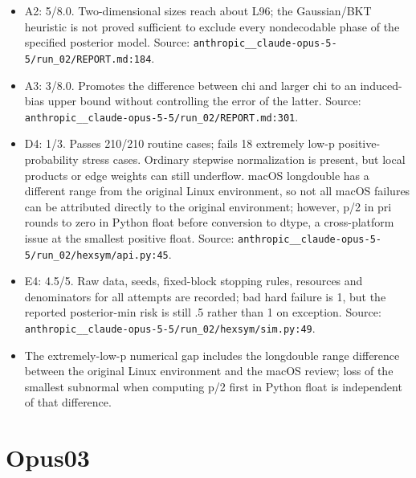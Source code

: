 \documentclass[11pt,a4paper]{article}
\begin{document}
\begin{itemize}
\item A2: 5/\allowbreak{}8.0. Two-dimensional sizes reach about L96; the Gaussian/\allowbreak{}BKT heuristic is not proved sufficient to exclude every nondecodable phase of the specified posterior model. Source: \nolinkurl{anthropic__claude-opus-5-5/run_02/REPORT.md:184}.
\item A3: 3/\allowbreak{}8.0. Promotes the difference between chi and larger chi to an induced-bias upper bound without controlling the error of the latter. Source: \nolinkurl{anthropic__claude-opus-5-5/run_02/REPORT.md:301}.
\item D4: 1/\allowbreak{}3. Passes 210/\allowbreak{}210 routine cases; fails 18 extremely low-p positive-probability stress cases. Ordinary stepwise normalization is present, but local products or edge weights can still underflow. macOS longdouble has a different range from the original Linux environment, so not all macOS failures can be attributed directly to the original environment; however, p/\allowbreak{}2 in pri rounds to zero in Python float before conversion to dtype, a cross-platform issue at the smallest positive float. Source: \nolinkurl{anthropic__claude-opus-5-5/run_02/hexsym/api.py:45}.
\item E4: 4.5/\allowbreak{}5. Raw data, seeds, fixed-block stopping rules, resources and denominators for all attempts are recorded; bad hard failure is 1, but the reported posterior-min risk is still .5 rather than 1 on exception. Source: \nolinkurl{anthropic__claude-opus-5-5/run_02/hexsym/sim.py:49}.
\item The extremely-low-p numerical gap includes the longdouble range difference between the original Linux environment and the macOS review; loss of the smallest subnormal when computing p/\allowbreak{}2 first in Python float is independent of that difference.
\end{itemize}

\section*{Opus03}
\end{document}
